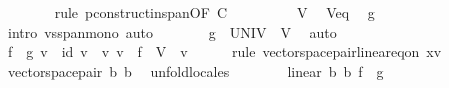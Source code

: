 \begin{isabellebody}
\ \ \ \ \ \ \isamarkupfalse%
\ {\isacharparenleft}{\kern0pt}rule\ p{\isachardot}{\kern0pt}construct{\isacharunderscore}{\kern0pt}in{\isacharunderscore}{\kern0pt}span{\isacharbrackleft}{\kern0pt}OF\ C{\isacharbrackright}{\kern0pt}{\isacharparenright}{\kern0pt}\isanewline
\ \ \ \ \isamarkupfalse%
\ \isamarkupfalse%
\ {\isachardoublequoteopen}{\isasymdots}\ {\isasymsubseteq}\ V{\isachardoublequoteclose}\ \isamarkupfalse%
\ V{\isacharunderscore}{\kern0pt}eq\ \isamarkupfalse%
\ g\ \isamarkupfalse%
\ {\isacharparenleft}{\kern0pt}intro\ vs{}{\isachardot}{\kern0pt}span{\isacharunderscore}{\kern0pt}mono{\isacharparenright}{\kern0pt}\ auto\isanewline
\ \ \ \ \isamarkupfalse%
\ \isamarkupfalse%
\ {\isachardoublequoteopen}{\isacharquery}{\kern0pt}g\ {\isacharbackquote}{\kern0pt}\ UNIV\ {\isasymsubseteq}\ V{\isachardoublequoteclose}\ \isamarkupfalse%
\ auto\isanewline
\ \ \ \ \isamarkupfalse%
\ {\isachardoublequoteopen}{\isacharparenleft}{\kern0pt}f\ {\isasymcirc}\ {\isacharquery}{\kern0pt}g{\isacharparenright}{\kern0pt}\ v\ {\isacharequal}{\kern0pt}\ id\ v{\isachardoublequoteclose}\ \ v{\isacharcolon}{\kern0pt}\ {\isachardoublequoteopen}v\ {\isasymin}\ f\ {\isacharbackquote}{\kern0pt}\ V{\isachardoublequoteclose}\ \ v\isanewline
\ \ \ \ \isamarkupfalse%
\ {\isacharparenleft}{\kern0pt}rule\ vector{\isacharunderscore}{\kern0pt}space{\isacharunderscore}{\kern0pt}pair{\isachardot}{\kern0pt}linear{\isacharunderscore}{\kern0pt}eq{\isacharunderscore}{\kern0pt}on{\isacharbrackleft}{\kern0pt}\ x{\isacharequal}{\kern0pt}v{\isacharbrackright}{\kern0pt}{\isacharparenright}{\kern0pt}\isanewline
\ \ \ \ \ \ \isamarkupfalse%
\ {\isachardoublequoteopen}vector{\isacharunderscore}{\kern0pt}space{\isacharunderscore}{\kern0pt}pair\ {\isacharparenleft}{\kern0pt}{\isacharasterisk}{\kern0pt}b{\isacharparenright}{\kern0pt}\ {\isacharparenleft}{\kern0pt}{\isacharasterisk}{\kern0pt}b{\isacharparenright}{\kern0pt}{\isachardoublequoteclose}\ \isamarkupfalse%
\ unfold{\isacharunderscore}{\kern0pt}locales\isanewline
\ \ \ \ \ \ \isamarkupfalse%
\ {\isachardoublequoteopen}linear\ {\isacharparenleft}{\kern0pt}{\isacharasterisk}{\kern0pt}b{\isacharparenright}{\kern0pt}\ {\isacharparenleft}{\kern0pt}{\isacharasterisk}{\kern0pt}b{\isacharparenright}{\kern0pt}\ {\isacharparenleft}{\kern0pt}f\ {\isasymcirc}\ {\isacharquery}{\kern0pt}g{\isacharparenright}{\kern0pt}{\isachardoublequoteclose}\isanewline

\end{isabellebody}
